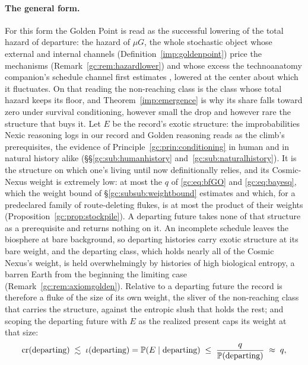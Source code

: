 \paragraph{The general form.}\label{gc:par:departuresgeneral}
For this form the Golden Point is read as the successful
lowering of the total hazard of departure: the hazard of $\mu G$, the
whole stochastic object whose external and internal channels
(Definition~\ref{imp:goldenpoint}) price the mechanisms
(Remark~\ref{gc:rem:hazardlower}) and whose excess the technoanatomy
companion's schedule channel first estimates \cite{GoldenTechnoanatomy},
lowered at the center about which it fluctuates. On that reading the
non-reaching class is the class whose total hazard keeps its floor, and
Theorem~\ref{imp:emergence} is why its share falls toward zero under
survival conditioning, however small the drop and however rare the
structure that buys it. Let $E$ be the record's exotic structure: the
improbabilities Nexic reasoning logs in our record and Golden reasoning
reads as the climb's prerequisites, the evidence of
Principle~\ref{gc:prin:conditioning} in human and in natural history
alike (\S\S\ref{gc:sub:humanhistory} and~\ref{gc:sub:naturalhistory}).
It is the structure on which one's living until now definitionally
relies, and its Cosmic-Nexus weight is extremely low: at most the $q$ of
\eqref{gc:eq:bfGO} and \eqref{gc:eq:bayesq}, which the weight bound of
\S\ref{gc:subsub:weightbound} estimates and which, for a predeclared
family of route-deleting flukes, is at most the product of their weights
(Proposition~\ref{gc:prop:stockpile}). A departing future takes none of
that structure as a prerequisite and returns nothing on it. An
incomplete schedule leaves the biosphere at bare background, so
departing histories carry exotic structure at its bare weight, and the
departing class, which holds nearly all of the Cosmic Nexus's weight, is
held overwhelmingly by histories of high biological entropy, a barren
Earth from the beginning the limiting case
(Remark~\ref{gc:rem:axiomgolden}). Relative to a departing future the
record is therefore a fluke of the size of its own weight, the sliver of
the non-reaching class that carries the structure, against the entropic
slush that holds the rest; and scoping the departing future with $E$ as
the realized present caps its weight at that size:
\begin{equation}\label{gc:eq:departgeneral}
\mathrm{cr}(\text{departing})\;\lesssim\;\iota(\text{departing})
=\mathbb{P}(E\mid\text{departing})
\;\le\;\frac{q}{\mathbb{P}(\text{departing})}\;\approx\;q,
\end{equation}

